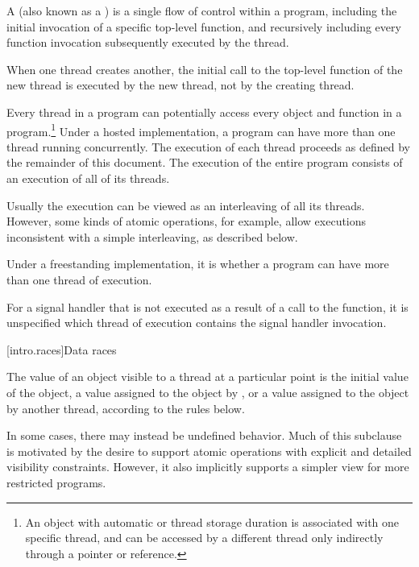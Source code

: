 \pnum
{}%
%
A  (also known as a ) is a single flow of
control within a program, including the initial invocation of a specific
top-level function, and recursively including every function invocation
subsequently executed by the thread.
\begin{note}
When one thread creates another,
the initial call to the top-level function of the new thread is executed by the
new thread, not by the creating thread.
\end{note}
Every thread in a program can
potentially access every object and function in a program.\footnote{An object
with automatic or thread storage duration is associated with
one specific thread, and can be accessed by a different thread only indirectly
through a pointer or reference.} Under a hosted
implementation, a \Cpp{} program can have more than one thread running
concurrently. The execution of each thread proceeds as defined by the remainder
of this document. The execution of the entire program consists of an execution
of all of its threads.
\begin{note}
Usually the execution can be viewed as an
interleaving of all its threads. However, some kinds of atomic operations, for
example, allow executions inconsistent with a simple interleaving, as described
below.
\end{note}
Under a freestanding implementation, it is  whether a program can
have more than one thread of execution.

\pnum
For a signal handler that is not executed as a result of a call to the
 function, it is unspecified which thread of execution
contains the signal handler invocation.

[intro.races]{Data races}

\pnum
The value of an object visible to a thread  at a particular point is the
initial value of the object, a value assigned to the object by , or a
value assigned to the object by another thread, according to the rules below.
\begin{note}
In some cases, there may instead be undefined behavior. Much of this
subclause is motivated by the desire to support atomic operations with explicit
and detailed visibility constraints. However, it also implicitly supports a
simpler view for more restricted programs.
\end{note}

